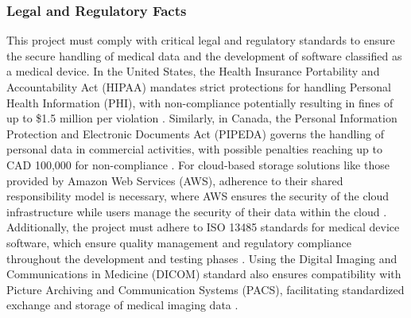 \documentclass[12pt]{article}
\begin{document}
\subsubsection{Legal and Regulatory Facts} \label{sec_legal}
This project must comply with critical legal and regulatory standards to ensure the secure handling of medical data and the development of software classified as a medical device. In the United States, the Health Insurance Portability and Accountability Act (HIPAA) mandates strict protections for handling Personal Health Information (PHI), with non-compliance potentially resulting in fines of up to \$1.5 million per violation \cite{10}. Similarly, in Canada, the Personal Information Protection and Electronic Documents Act (PIPEDA) governs the handling of personal data in commercial activities, with possible penalties reaching up to CAD 100,000 for non-compliance \cite{2}. For cloud-based storage solutions like those provided by Amazon Web Services (AWS), adherence to their shared responsibility model is necessary, where AWS ensures the security of the cloud infrastructure while users manage the security of their data within the cloud \cite{7}. Additionally, the project must adhere to ISO 13485 standards for medical device software, which ensure quality management and regulatory compliance throughout the development and testing phases \cite{8}. Using the Digital Imaging and Communications in Medicine (DICOM) standard also ensures compatibility with Picture Archiving and Communication Systems (PACS), facilitating standardized exchange and storage of medical imaging data \cite{9}.
\end{document}

